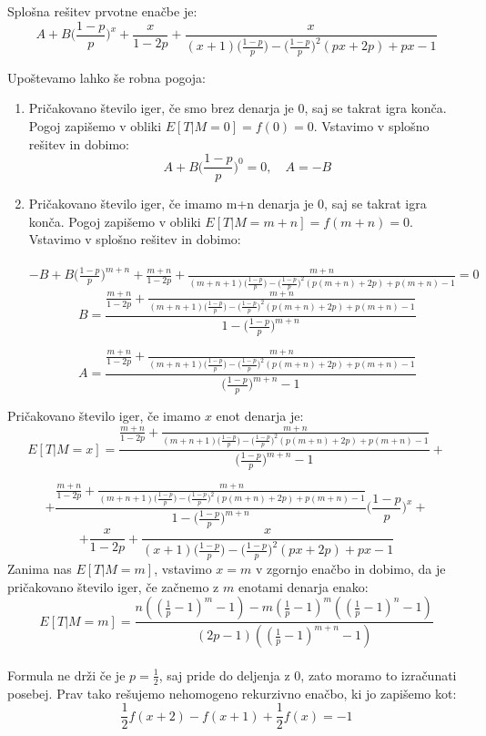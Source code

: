 \documentclass[12pt, a4paper]{article}
\begin{document}
Splošna rešitev prvotne enačbe je: $$A + B\bigg( \frac{1-p}{p} \bigg )^x+\frac{x}{1-2p}+\frac{x}{(x+1)\big( \frac{1-p}{p} \big )-\big( \frac{1-p}{p} \big )^2(px+2p)+px-1}$$

Upoštevamo lahko še robna pogoja:
\begin{enumerate}
\item Pričakovano število iger, če smo brez denarja je 0, saj se takrat igra konča. Pogoj zapišemo v obliki $E[T|M= 0] = f(0) = 0$. Vstavimo v splošno rešitev in dobimo:
$$A + B\bigg( \frac{1-p}{p} \bigg )^0 = 0, \quad A = -B$$
\item Pričakovano število iger, če imamo m+n denarja je 0, saj se takrat igra konča. Pogoj zapišemo v obliki $E[T|M= m+n] = f(m+n) = 0$. Vstavimo v splošno rešitev in dobimo:\\\\
$-B + B\bigg( \frac{1-p}{p} \bigg )^{m+n}+\frac{m+n}{1-2p}+\frac{m+n}{(m+n+1)\big( \frac{1-p}{p} \big )-\big( \frac{1-p}{p} \big )^2(p(m+n)+2p)+p(m+n)-1}=0$\\

$$B = \frac{\frac{m+n}{1-2p}+\frac{m+n}{(m+n+1)\big( \frac{1-p}{p} \big )-\big( \frac{1-p}{p} \big )^2(p(m+n)+2p)+p(m+n)-1}}{1-\big( \frac{1-p}{p} \big )^{m+n}}$$

$$A = \frac{\frac{m+n}{1-2p}+\frac{m+n}{(m+n+1)\big( \frac{1-p}{p} \big )-\big( \frac{1-p}{p} \big )^2(p(m+n)+2p)+p(m+n)-1}}{\big( \frac{1-p}{p} \big )^{m+n}-1}$$
\end{enumerate}

Pričakovano število iger, če imamo $x$ enot denarja je: $$E[ T | M = x]= \frac{\frac{m+n}{1-2p}+\frac{m+n}{(m+n+1)\big( \frac{1-p}{p} \big )-\big( \frac{1-p}{p} \big )^2(p(m+n)+2p)+p(m+n)-1}}{\big( \frac{1-p}{p} \big )^{m+n}-1}+$$

 $$+\frac{\frac{m+n}{1-2p}+\frac{m+n}{(m+n+1)\big( \frac{1-p}{p} \big )-\big( \frac{1-p}{p} \big )^2(p(m+n)+2p)+p(m+n)-1}}{1-\big( \frac{1-p}{p} \big )^{m+n}}\big( \frac{1-p}{p} \big )^x+$$ $$+\frac{x}{1-2p}+\frac{x}{(x+1)\big( \frac{1-p}{p} \big )-\big( \frac{1-p}{p} \big )^2(px+2p)+px-1}$$
 Zanima nas $E[T|M=m]$, vstavimo $x=m$ v zgornjo enačbo in dobimo, da je pričakovano število iger, če začnemo z $m$ enotami denarja enako: $$E[T|M=m]=\frac{n \left(\left(\frac{1}{p}-1\right)^m-1\right)-m \left(\frac{1}{p}-1\right)^m
   \left(\left(\frac{1}{p}-1\right)^n-1\right)}{(2 p-1)
   \left(\left(\frac{1}{p}-1\right)^{m+n}-1\right)}$$
 \\
 Formula ne drži če je $p = \frac{1}{2}$, saj pride do deljenja z 0, zato moramo to izračunati posebej. Prav tako rešujemo nehomogeno rekurzivno enačbo, ki jo zapišemo kot: $$\frac{1}{2}f(x+2)-f(x+1)+\frac{1}{2}f(x)=-1$$
\end{document}
